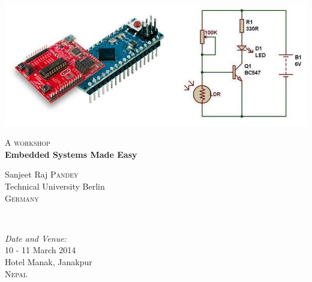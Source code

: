 \documentclass[12pt]{article} %
\begin{document}

\begin{titlepage}

\newcommand{\HRule}{\rule{\linewidth}{0.5mm}} %


  \begin{flushright}
    \includegraphics[width=1\textwidth]{circuits}
  \end{flushright}

\vspace{30 mm}

\textsc{\large A workshop}\\ %

{ \huge \bfseries Embedded Systems Made Easy}\\[0.4cm] %

\begin{minipage}{0.4\textwidth}
\begin{flushleft}
Sanjeet Raj \textsc{Pandey}\\ 
Technical University Berlin\\ 
\textsc{Germany}\\ 
\end{flushleft}
\end{minipage} \\[4cm]

\begin{minipage}{0.4\textwidth}
\begin{flushleft}
\emph{\large Date and Venue:}\\
\large 10 - 11 March 2014\\
Hotel Manak, Janakpur\\ 
\textsc{Nepal}\\ 
\end{flushleft}
\end{minipage}

\vfill %

\end{titlepage}
\end{document}
